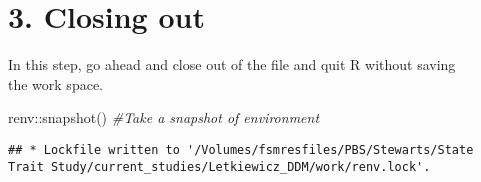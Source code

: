 \documentclass[
]{article}
\newenvironment{Shaded}{\begin{snugshade}}{\end{snugshade}}
\newcommand{\AttributeTok}[1]{\textcolor[rgb]{0.77,0.63,0.00}{#1}}
\newcommand{\CommentTok}[1]{\textcolor[rgb]{0.56,0.35,0.01}{\textit{#1}}}
\newcommand{\FunctionTok}[1]{\textcolor[rgb]{0.00,0.00,0.00}{#1}}
\newcommand{\NormalTok}[1]{#1}
\newcommand{\SpecialCharTok}[1]{\textcolor[rgb]{0.00,0.00,0.00}{#1}}
\newcommand{\StringTok}[1]{\textcolor[rgb]{0.31,0.60,0.02}{#1}}
\begin{document}
\begin{Shaded}
\end{Shaded}

\hypertarget{closing-out}{%
\section{3. Closing out}\label{closing-out}}

In this step, go ahead and close out of the file and quit R without
saving\\
the work space.

\begin{Shaded}
\begin{Highlighting}[]
\NormalTok{   renv}\SpecialCharTok{::}\FunctionTok{snapshot}\NormalTok{()   }\CommentTok{\#Take a snapshot of environment}
\end{Highlighting}
\end{Shaded}

\begin{verbatim}
## * Lockfile written to '/Volumes/fsmresfiles/PBS/Stewarts/State Trait Study/current_studies/Letkiewicz_DDM/work/renv.lock'.
\end{verbatim}
\end{document}

